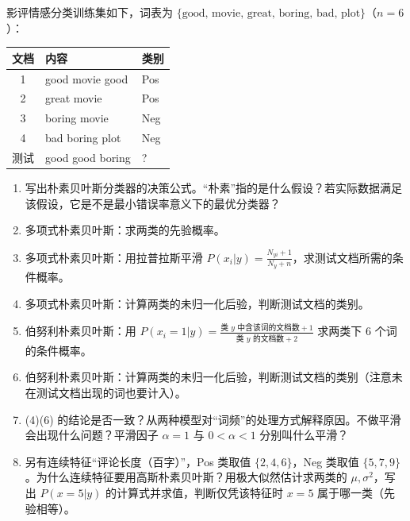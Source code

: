 影评情感分类训练集如下，词表为 $\{\text{good, movie, great, boring, bad, plot}\}$（$n=6$）：
\begin{center}
\renewcommand{\arraystretch}{1.15}
\begin{tabular}{cll}
\toprule
文档 & 内容 & 类别\\ \midrule
1 & good movie good & Pos\\
2 & great movie & Pos\\
3 & boring movie & Neg\\
4 & bad boring plot & Neg\\ \midrule
测试 & good good boring & ?\\
\bottomrule
\end{tabular}
\end{center}
\begin{enumerate}[label=(\arabic*)]
\item 写出朴素贝叶斯分类器的决策公式。“朴素”指的是什么假设？若实际数据满足该假设，它是不是最小错误率意义下的最优分类器？
\item 多项式朴素贝叶斯：求两类的先验概率。
\item 多项式朴素贝叶斯：用拉普拉斯平滑 $P(x_i|y)=\frac{N_{yi}+1}{N_y+n}$，求测试文档所需的条件概率。
\item 多项式朴素贝叶斯：计算两类的未归一化后验，判断测试文档的类别。
\item 伯努利朴素贝叶斯：用 $P(x_i=1|y)=\frac{\text{类 }y\text{ 中含该词的文档数}+1}{\text{类 }y\text{ 的文档数}+2}$ 求两类下 6 个词的条件概率。
\item 伯努利朴素贝叶斯：计算两类的未归一化后验，判断测试文档的类别（注意未在测试文档出现的词也要计入）。
\item (4)(6) 的结论是否一致？从两种模型对“词频”的处理方式解释原因。不做平滑会出现什么问题？平滑因子 $\alpha=1$ 与 $0<\alpha<1$ 分别叫什么平滑？
\item 另有连续特征“评论长度（百字）”，Pos 类取值 $\{2,4,6\}$，Neg 类取值 $\{5,7,9\}$。为什么连续特征要用高斯朴素贝叶斯？用极大似然估计求两类的 $\mu,\sigma^2$，写出 $P(x=5|y)$ 的计算式并求值，判断仅凭该特征时 $x=5$ 属于哪一类（先验相等）。
\end{enumerate}

